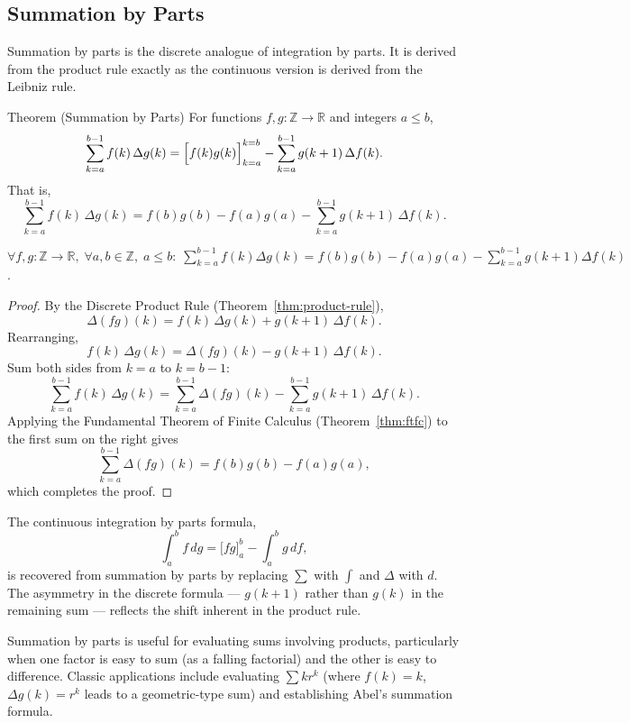 
\subsection*{Summation by Parts}

Summation by parts is the discrete analogue of integration by parts.
It is derived from the product rule exactly as the continuous version
is derived from the Leibniz rule.

\begin{theorembox}{Theorem (Summation by Parts)}
For functions \(f, g : \mathbb{Z} \to \mathbb{R}\) and integers \(a \le b\),
\[
\sum_{k=a}^{b-1} f(k)\,\Delta g(k)
=
\Bigl[f(k)g(k)\Bigr]_{k=a}^{k=b}
-
\sum_{k=a}^{b-1} g(k+1)\,\Delta f(k).
\]
That is,
\[
\sum_{k=a}^{b-1} f(k)\,\Delta g(k)
=
f(b)g(b)-f(a)g(a)
-
\sum_{k=a}^{b-1} g(k+1)\,\Delta f(k).
\]
\end{theorembox}
\label{thm:summation-by-parts}

\begin{remark*}
\(\forall f,g : \mathbb{Z}\to\mathbb{R},\; \forall a,b\in\mathbb{Z},\; a\le b:\;
\displaystyle\sum_{k=a}^{b-1}f(k)\Delta g(k)
= f(b)g(b) - f(a)g(a) - \sum_{k=a}^{b-1}g(k+1)\Delta f(k)\).
\end{remark*}

\begin{proof}
By the Discrete Product Rule (Theorem~\ref{thm:product-rule}),
\[
\Delta(fg)(k) = f(k)\,\Delta g(k) + g(k+1)\,\Delta f(k).
\]
Rearranging,
\[
f(k)\,\Delta g(k) = \Delta(fg)(k) - g(k+1)\,\Delta f(k).
\]
Sum both sides from \(k = a\) to \(k = b-1\):
\[
\sum_{k=a}^{b-1} f(k)\,\Delta g(k)
=
\sum_{k=a}^{b-1} \Delta(fg)(k)
-
\sum_{k=a}^{b-1} g(k+1)\,\Delta f(k).
\]
Applying the Fundamental Theorem of Finite Calculus
(Theorem~\ref{thm:ftfc}) to the first sum on the right gives
\[
\sum_{k=a}^{b-1} \Delta(fg)(k) = f(b)g(b) - f(a)g(a),
\]
which completes the proof.
\end{proof}

\begin{remark*}
The continuous integration by parts formula,
\[
\int_a^b f\,dg = \bigl[fg\bigr]_a^b - \int_a^b g\,df,
\]
is recovered from summation by parts by replacing \(\sum\) with
\(\int\) and \(\Delta\) with \(d\). The asymmetry in the discrete
formula --- \(g(k+1)\) rather than \(g(k)\) in the remaining sum ---
reflects the shift inherent in the product rule.
\end{remark*}

\begin{remark*}[Applications]
Summation by parts is useful for evaluating sums involving products,
particularly when one factor is easy to sum (as a falling factorial)
and the other is easy to difference. Classic applications include
evaluating \(\sum k r^k\) (where \(f(k) = k\), \(\Delta g(k) = r^k\)
leads to a geometric-type sum) and establishing Abel's summation formula.
\end{remark*}
